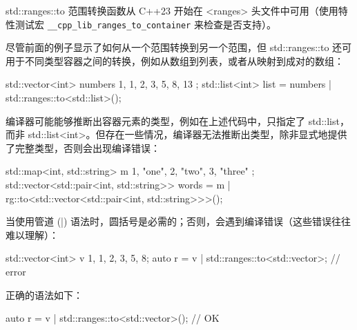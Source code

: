 
std::ranges::to 范围转换函数从 C++23 开始在 <ranges> 头文件中可用（使用特性测试宏 \verb|__cpp_lib_ranges_to_container| 来检查是否支持）。

尽管前面的例子显示了如何从一个范围转换到另一个范围，但 std::ranges::to 还可用于不同类型容器之间的转换，例如从数组到列表，或者从映射到成对的数组：

\begin{cpp}
std::vector<int> numbers{ 1, 1, 2, 3, 5, 8, 13 };
std::list<int> list = numbers | std::ranges::to<std::list>();
\end{cpp}

编译器可能能够推断出容器元素的类型，例如在上述代码中，只指定了 std::list，而非 std::list<int>。但存在一些情况，编译器无法推断出类型，除非显式地提供了完整类型，否则会出现编译错误：

\begin{cpp}
std::map<int, std::string> m{ {1, "one"}, {2, "two"}, {3, "three"} };
std::vector<std::pair<int, std::string>> words =
    m | rg::to<std::vector<std::pair<int, std::string>>>();
\end{cpp}

当使用管道 (|) 语法时，圆括号是必需的；否则，会遇到编译错误（这些错误往往难以理解）：

\begin{cpp}
std::vector<int> v {1, 1, 2, 3, 5, 8};
auto r = v | std::ranges::to<std::vector>;   // error
\end{cpp}

正确的语法如下：

\begin{cpp}
auto r = v | std::ranges::to<std::vector>();  // OK
\end{cpp}


